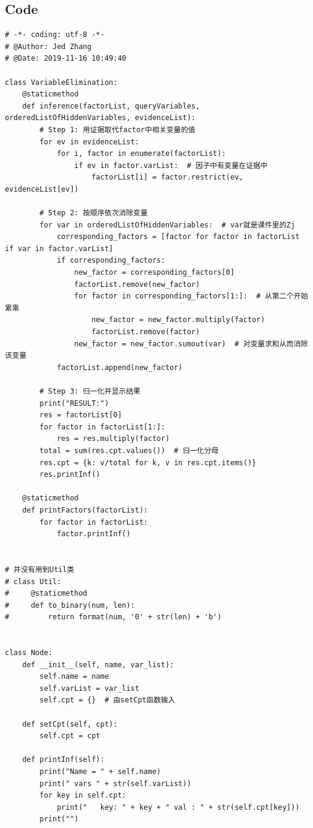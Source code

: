 \documentclass[a4paper, 11pt]{article}
\begin{document}
\subsection{Code}
\begin{lstlisting}
# -*- coding: utf-8 -*-
# @Author: Jed Zhang 
# @Date: 2019-11-16 10:49:40

class VariableElimination:
    @staticmethod
    def inference(factorList, queryVariables, orderedListOfHiddenVariables, evidenceList):
        # Step 1: 用证据取代factor中相关变量的值
        for ev in evidenceList:
            for i, factor in enumerate(factorList):
                if ev in factor.varList:  # 因子中有变量在证据中
                    factorList[i] = factor.restrict(ev, evidenceList[ev])
            
        # Step 2: 按顺序依次消除变量
        for var in orderedListOfHiddenVariables:  # var就是课件里的Zj
            corresponding_factors = [factor for factor in factorList if var in factor.varList]
            if corresponding_factors:
                new_factor = corresponding_factors[0]
                factorList.remove(new_factor)
                for factor in corresponding_factors[1:]:  # 从第二个开始累乘
                    new_factor = new_factor.multiply(factor)
                    factorList.remove(factor)
                new_factor = new_factor.sumout(var)  # 对变量求和从而消除该变量
            factorList.append(new_factor)

        # Step 3: 归一化并显示结果
        print("RESULT:")
        res = factorList[0]
        for factor in factorList[1:]:
            res = res.multiply(factor)
        total = sum(res.cpt.values())  # 归一化分母
        res.cpt = {k: v/total for k, v in res.cpt.items()}
        res.printInf()

    @staticmethod
    def printFactors(factorList):
        for factor in factorList:
            factor.printInf()


# 并没有用到Util类
# class Util:
#     @staticmethod
#     def to_binary(num, len):
#         return format(num, '0' + str(len) + 'b')


class Node:
    def __init__(self, name, var_list):
        self.name = name
        self.varList = var_list
        self.cpt = {}  # 由setCpt函数输入

    def setCpt(self, cpt):
        self.cpt = cpt

    def printInf(self):
        print("Name = " + self.name)
        print(" vars " + str(self.varList))
        for key in self.cpt:
            print("   key: " + key + " val : " + str(self.cpt[key]))
        print("")


\end{lstlisting}
\end{document}
